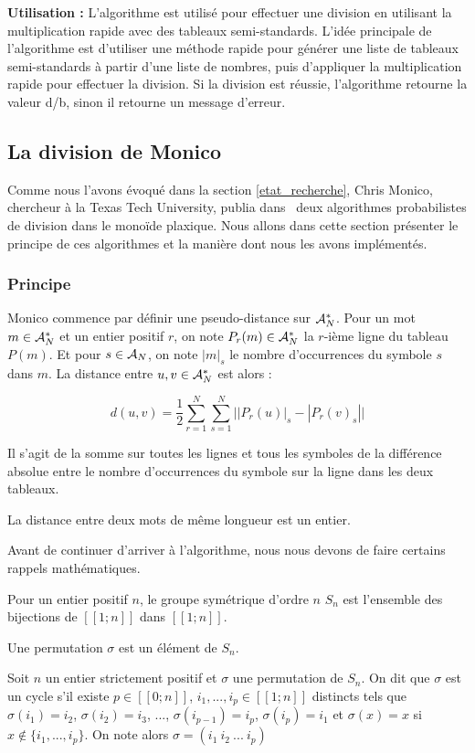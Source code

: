 \textbf{Utilisation :}
L'algorithme est utilisé pour effectuer une division en utilisant la multiplication rapide avec des tableaux semi-standards. 
L'idée principale de l'algorithme est d'utiliser une méthode rapide pour générer une liste de tableaux semi-standards à partir d'une liste de nombres,
 puis d'appliquer la multiplication rapide pour effectuer la division. 
Si la division est réussie, l'algorithme retourne la valeur d/b, sinon il retourne un message d'erreur.
\pagebreak
\subsection{La division de Monico}
Comme nous l'avons évoqué dans la section \ref{etat_recherche}, Chris Monico, chercheur à la Texas Tech University, publia dans~\cite{monico2022division} deux algorithmes probabilistes de division dans le monoïde plaxique. Nous allons dans cette section présenter le principe de ces algorithmes et la manière dont nous les avons implémentés.

\subsubsection{Principe}
Monico commence par définir une pseudo-distance sur $\mathcal{A}_N^*$. Pour un mot $m \in \mathcal{A}_N^*$ et un entier positif $r$, on note $P_r(m) \in \mathcal{A}_N^*$ la $r$-ième ligne du tableau $P(m)$. Et pour $s \in \mathcal{A}_N$, on note $|m|_s$ le nombre d'occurrences du symbole $s$ dans $m$. La distance entre $u,v \in \mathcal{A}_N^*$ est alors : 
\begin{definition}[distance]
	$$d(u,v) = \frac{1}{2}\sum_{r=1}^{N}\sum_{s=1}^{N}\bigl||P_r(u)|_s - |P_r(v)_s|\bigr|$$
\end{definition}

Il s'agit de la somme sur toutes les lignes et tous les symboles de la différence absolue entre le nombre d'occurrences du symbole sur la ligne dans les deux tableaux.

\begin{property} \label{prop:dist}
	La distance entre deux mots de même longueur est un entier.
\end{property}

Avant de continuer d'arriver à l'algorithme, nous nous devons de faire certains rappels mathématiques.
\begin{definition}
	Pour un entier positif $n$, le groupe symétrique d'ordre $n$ $S_n$ est l'ensemble des bijections de $[\![1;n]\!]$ dans $[\![1;n]\!]$.
\end{definition}
\begin{definition}[permutation]
	Une permutation $\sigma$ est un élément de $S_n$.
\end{definition}
\begin{definition}[cycle]
	Soit $n$ un entier strictement positif et $\sigma$ une permutation de $S_n$. On dit que $\sigma$ est un cycle s'il existe $p \in [\![0;n]\!]$, $i_1,...,i_p \in [\![1;n]\!]$ distincts tels que $\sigma(i_1)=i_2$, $\sigma(i_2)=i_3$, ..., $\sigma(i_{p-1})=i_p$, $\sigma(i_p)=i_1$ et $\sigma(x)=x$ si $x \notin \{i_1,...,i_p\}$. On note alors $\sigma=(i_1\ i_2\ ...\ i_p)$
\end{definition}

